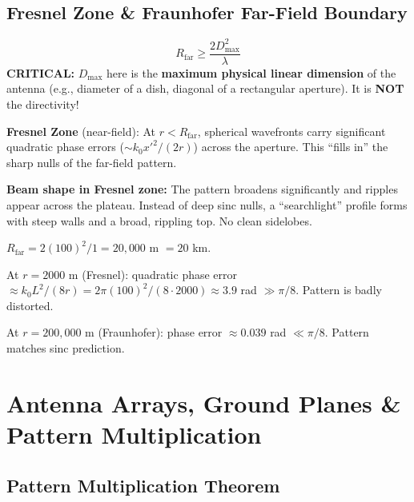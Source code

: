\documentclass[10pt,letterpaper]{article}
\begin{document}
\subsection{Fresnel Zone \& Fraunhofer Far-Field Boundary}

\begin{tcolorbox}[formulabox, title={Fraunhofer Far-Field Boundary}]
\begin{equation}
  R_\mathrm{far} \geq \frac{2D_\mathrm{max}^2}{\lambda}
\end{equation}
\textbf{CRITICAL:} $D_\mathrm{max}$ here is the \textbf{maximum physical linear dimension} of the antenna (e.g., diameter of a dish, diagonal of a rectangular aperture). It is \textbf{NOT} the directivity!

\textbf{Fresnel Zone} (near-field): At $r < R_\mathrm{far}$, spherical wavefronts carry significant quadratic phase errors ($\sim k_0 x'^2/(2r)$) across the aperture. This ``fills in'' the sharp nulls of the far-field pattern.

\textbf{Beam shape in Fresnel zone:} The pattern broadens significantly and ripples appear across the plateau. Instead of deep sinc nulls, a ``searchlight'' profile forms with steep walls and a broad, rippling top. No clean sidelobes.
\end{tcolorbox}

\begin{tcolorbox}[examplebox, title={HW4 P4 Example: $L_x = 100$ m, $\lambda = 1$ m}]
$R_\mathrm{far} = 2(100)^2/1 = 20{,}000$ m $= 20$ km.

At $r = 2000$ m (Fresnel): quadratic phase error $\approx k_0 L^2/(8r) = 2\pi(100)^2/(8\cdot2000) \approx 3.9$ rad $\gg\pi/8$. Pattern is badly distorted.

At $r = 200{,}000$ m (Fraunhofer): phase error $\approx 0.039$ rad $\ll\pi/8$. Pattern matches sinc prediction.
\end{tcolorbox}

\section{Antenna Arrays, Ground Planes \& Pattern Multiplication}

\subsection{Pattern Multiplication Theorem}
\end{document}
